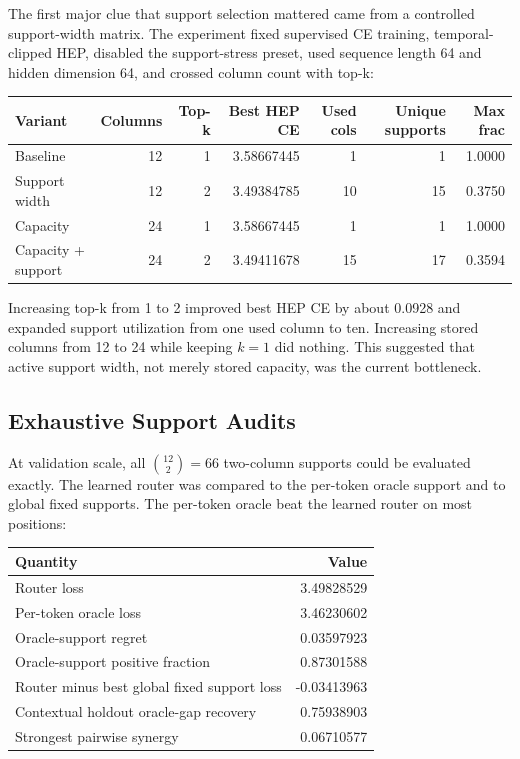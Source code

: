\documentclass[11pt]{article}
\begin{document}
The first major clue that support selection mattered came from a controlled
support-width matrix. The experiment fixed supervised CE training,
temporal-clipped HEP, disabled the support-stress preset, used sequence length
64 and hidden dimension 64, and crossed column count with top-k:

\begin{center}
\begin{tabular}{lrrrrrr}
\toprule
Variant & Columns & Top-k & Best HEP CE & Used cols & Unique supports & Max frac \\
\midrule
Baseline & 12 & 1 & 3.58667445 & 1 & 1 & 1.0000 \\
Support width & 12 & 2 & 3.49384785 & 10 & 15 & 0.3750 \\
Capacity & 24 & 1 & 3.58667445 & 1 & 1 & 1.0000 \\
Capacity + support & 24 & 2 & 3.49411678 & 15 & 17 & 0.3594 \\
\bottomrule
\end{tabular}
\end{center}

Increasing top-k from 1 to 2 improved best HEP CE by about 0.0928 and expanded
support utilization from one used column to ten. Increasing stored columns
from 12 to 24 while keeping \(k=1\) did nothing. This suggested that active
support width, not merely stored capacity, was the current bottleneck.

\subsection{Exhaustive Support Audits}

At validation scale, all \( \binom{12}{2} = 66 \) two-column supports could be
evaluated exactly. The learned router was compared to the per-token oracle
support and to global fixed supports. The per-token oracle beat the learned
router on most positions:

\begin{center}
\begin{tabular}{lr}
\toprule
Quantity & Value \\
\midrule
Router loss & 3.49828529 \\
Per-token oracle loss & 3.46230602 \\
Oracle-support regret & 0.03597923 \\
Oracle-support positive fraction & 0.87301588 \\
Router minus best global fixed support loss & -0.03413963 \\
Contextual holdout oracle-gap recovery & 0.75938903 \\
Strongest pairwise synergy & 0.06710577 \\
\bottomrule
\end{tabular}
\end{center}
\end{document}
